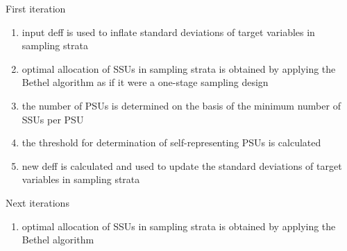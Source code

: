 \begin{algorithm}[h!]
	\SetAlgoLined
	
	\BlankLine
	\BlankLine
	\BlankLine
	 First iteration\;\label{first}
	\begin{enumerate}
		\item input deff is used to inflate standard 
		deviations of target variables in sampling strata\;
		\item  optimal allocation of SSUs in sampling strata 
		is obtained by applying the Bethel algorithm as if it were a one-stage sampling design\;
		\item  the number of PSUs is determined on the basis 
		of the minimum number of SSUs per PSU\;
		\item  the threshold for determination of self-representing PSUs is calculated\;
		\item new deff is calculated and used to update the standard deviations of target variables in sampling strata\;
	\end{enumerate}
	 Next iterations\;\label{iterations}
	 {
		\begin{enumerate}
			\item optimal allocation of SSUs in sampling strata is obtained by applying the Bethel algorithm\;

\end{enumerate}}
\end{algorithm}
